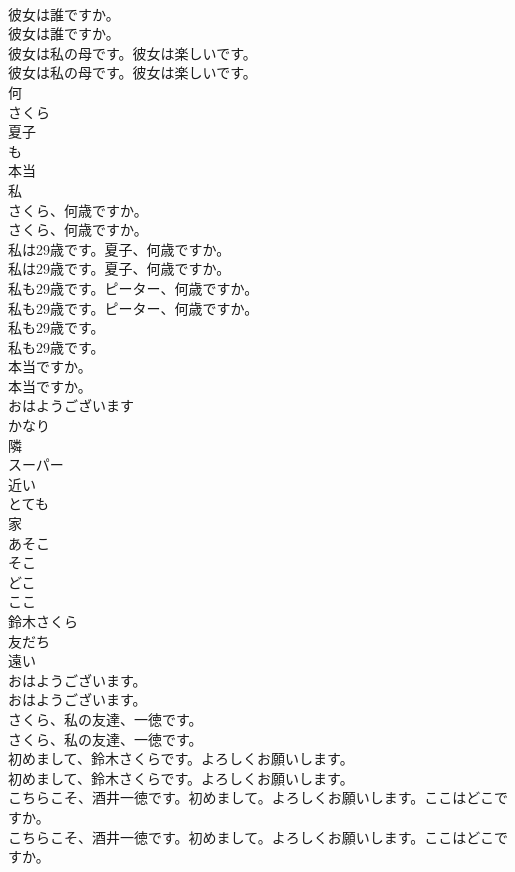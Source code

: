 \documentclass[8pt]{extreport}
\begin{document}
\begin{CJK}{UTF8}{min}
\\	彼女は誰ですか。	
\\	彼女は誰ですか。 
\\	彼女は私の母です。彼女は楽しいです。	
\\	彼女は私の母です。彼女は楽しいです。 
\\	何
\\	さくら
\\	夏子
\\	も
\\	本当
\\	私
\\	さくら、何歳ですか。	
\\	さくら、何歳ですか。 
\\	私は29歳です。夏子、何歳ですか。	
\\	私は29歳です。夏子、何歳ですか。 
\\	私も29歳です。ピーター、何歳ですか。	
\\	私も29歳です。ピーター、何歳ですか。 
\\	私も29歳です。	
\\	私も29歳です。 
\\	本当ですか。	
\\	本当ですか。 
\\	おはようございます
\\	かなり
\\	隣
\\	スーパー
\\	近い
\\	とても
\\	家
\\	あそこ
\\	そこ
\\	どこ
\\	ここ
\\	鈴木さくら
\\	友だち
\\	遠い
\\	おはようございます。	
\\	おはようございます。 
\\	さくら、私の友達、一徳です。	
\\	さくら、私の友達、一徳です。 
\\	初めまして、鈴木さくらです。よろしくお願いします。	
\\	初めまして、鈴木さくらです。よろしくお願いします。 
\\	こちらこそ、酒井一徳です。初めまして。よろしくお願いします。ここはどこですか。	
\\	こちらこそ、酒井一徳です。初めまして。よろしくお願いします。ここはどこですか。 

\end{CJK}
\end{document}
